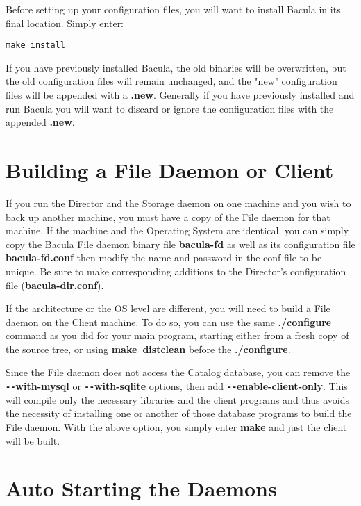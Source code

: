 Before setting up your configuration files, you will want to install Bacula in
its final location. Simply enter: 

\footnotesize
\begin{verbatim}
make install
\end{verbatim}
\normalsize

If you have previously installed Bacula, the old binaries will be overwritten,
but the old configuration files will remain unchanged, and the "new"
configuration files will be appended with a {\bf .new}. Generally if you have
previously installed and run Bacula you will want to discard or ignore the
configuration files with the appended {\bf .new}. 

\section{Building a File Daemon or Client}

If you run the Director and the Storage daemon on one machine and you wish to
back up another machine, you must have a copy of the File daemon for that
machine. If the machine and the Operating System are identical, you can simply
copy the Bacula File daemon binary file {\bf bacula-fd} as well as its
configuration file {\bf bacula-fd.conf} then modify the name and password in
the conf file to be unique. Be sure to make corresponding additions to the
Director's configuration file ({\bf bacula-dir.conf}). 

If the architecture or the OS level are different, you will need to build a
File daemon on the Client machine. To do so, you can use the same {\bf
./configure} command as you did for your main program, starting either from a
fresh copy of the source tree, or using {\bf make\ distclean} before the {\bf
./configure}. 

Since the File daemon does not access the Catalog database, you can remove
the {\bf \verb:--:with-mysql} or {\bf \verb:--:with-sqlite} options, then
add {\bf \verb:--:enable-client-only}.  This will compile only the
necessary libraries and the client programs and thus avoids the necessity
of installing one or another of those database programs to build the File
daemon.  With the above option, you simply enter {\bf make} and just the
client will be built.

\label{autostart}
\section{Auto Starting the Daemons}

